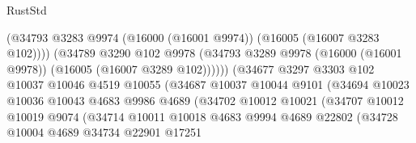 \begin{lexlean}{RustStd}
\begin{coremodule}
                                        (@34793
                                          @3283
                                          @9974
                                          (@16000 (@16001 @9974))
                                          (@16005 (@16007 @3283 @102))))
                                      (@34789
                                        @3290
                                        @102
                                        @9978
                                        (@34793
                                          @3289
                                          @9978
                                          (@16000 (@16001 @9978))
                                          (@16005 (@16007 @3289 @102))))))
                                  (@34677
                                    @3297
                                    @3303
                                    @102
                                    @10037
                                    @10046
                                    @4519
                                    @10055
                                    (@34687
                                      @10037
                                      @10044
                                      @9101
                                      (@34694
                                        @10023
                                        @10036
                                        @10043
                                        @4683
                                        @9986
                                        @4689
                                        (@34702
                                          @10012
                                          @10021
                                          (@34707
                                            @10012
                                            @10019
                                            @9074
                                            (@34714
                                              @10011
                                              @10018
                                              @4683
                                              @9994
                                              @4689
                                              @22802
                                              (@34728
                                                @10004
                                                @4689
                                                @34734
                                                @22901
                                                @17251

\end{coremodule}
\end{lexlean}
